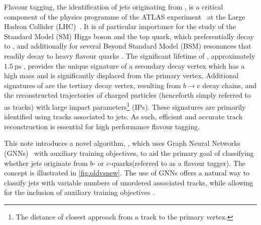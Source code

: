 Flavour tagging, the identification of jets originating from \bcquarks, is a critical component of the physics programme of the ATLAS experiment~\cite{PERF-2007-01} at the Large Hadron Collider (LHC)~\cite{Evans:2008zzb}.
It is of particular importance for the study of the Standard Model (SM) Higgs boson and the top quark, which preferentially decay to \bquarks \cite{HIGG-2018-04,HIGG-2018-13}, and additionally for several Beyond Standard Model (BSM) resonances that readily decay to heavy flavour quarks \cite{EXOT-2019-03}.
The significant lifetime of \bhadrons, approximately $\SI{1.5}{\ps}$ \cite{PhysRevD.98.030001}, provides the unique signature of a secondary decay vertex which has a high mass and is significantly displaced from the primary vertex. Additional signatures of \bhadrons are the tertiary decay vertex, resulting from $b \rightarrow c$ decay chains, and the reconstructed trajectories of charged particles (henceforth simply referred to as tracks) with large impact parameters\footnote{The distance of closest approach from a track to the primary vertex.} (IPs).
These signatures are primarily identified using tracks associated to jets. As such, efficient and accurate track reconstruction is essential for high performance flavour tagging.

This note introduces a novel algorithm, \GNN, which uses Graph Neural Networks (GNNs)~\cite{battaglia2018relational} with auxiliary training objectives, to aid the primary goal of classifying whether jets originate from \ensuremath{b\text{- or }c\text{-quarks}}\xspace(referred to as a flavour tagger). %
The concept is illustrated in \cref{fig:oldvsnew}.
The use of GNNs offers a natural way to classify jets with variable numbers of unordered associated tracks, while allowing for the inclusion of auxiliary training objectives \cite{2020-gnn-for-sv,serviansky2020set2graph}.

